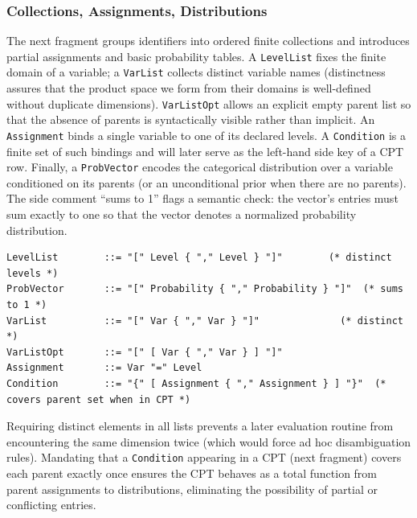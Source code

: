 \documentclass[11pt]{article}
\begin{document}
\subsubsection{Collections, Assignments, Distributions}
The next fragment groups identifiers into ordered finite collections and introduces partial assignments and basic probability tables. A \texttt{LevelList} fixes the finite domain of a variable; a \texttt{VarList} collects distinct variable names (distinctness assures that the product space we form from their domains is well-defined without duplicate dimensions). \texttt{VarListOpt} allows an explicit empty parent list so that the absence of parents is syntactically visible rather than implicit. An \texttt{Assignment} binds a single variable to one of its declared levels. A \texttt{Condition} is a finite set of such bindings and will later serve as the left-hand side key of a CPT row. Finally, a \texttt{ProbVector} encodes the categorical distribution over a variable conditioned on its parents (or an unconditional prior when there are no parents). The side comment “sums to 1” flags a semantic check: the vector's entries must sum exactly to one so that the vector denotes a normalized probability distribution.
\begin{lstlisting}[language=EBNF]
LevelList        ::= "[" Level { "," Level } "]"        (* distinct levels *)
ProbVector       ::= "[" Probability { "," Probability } "]"  (* sums to 1 *)
VarList          ::= "[" Var { "," Var } "]"              (* distinct *)
VarListOpt       ::= "[" [ Var { "," Var } ] "]"
Assignment       ::= Var "=" Level
Condition        ::= "{" [ Assignment { "," Assignment } ] "}"  (* covers parent set when in CPT *)
\end{lstlisting}
Requiring distinct elements in all lists prevents a later evaluation routine from encountering the same dimension twice (which would force ad hoc disambiguation rules). Mandating that a \texttt{Condition} appearing in a CPT (next fragment) covers each parent exactly once ensures the CPT behaves as a total function from parent assignments to distributions, eliminating the possibility of partial or conflicting entries.
\end{document}
